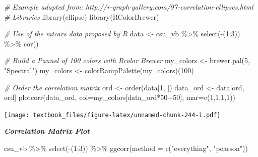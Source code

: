 \documentclass[
  11pt,
]{book}
\newenvironment{Shaded}{\begin{snugshade}}{\end{snugshade}}
\newcommand{\AttributeTok}[1]{\textcolor[rgb]{0.77,0.63,0.00}{#1}}
\newcommand{\CommentTok}[1]{\textcolor[rgb]{0.56,0.35,0.01}{\textit{#1}}}
\newcommand{\DecValTok}[1]{\textcolor[rgb]{0.00,0.00,0.81}{#1}}
\newcommand{\FunctionTok}[1]{\textcolor[rgb]{0.00,0.00,0.00}{#1}}
\newcommand{\NormalTok}[1]{#1}
\newcommand{\OtherTok}[1]{\textcolor[rgb]{0.56,0.35,0.01}{#1}}
\newcommand{\SpecialCharTok}[1]{\textcolor[rgb]{0.00,0.00,0.00}{#1}}
\newcommand{\StringTok}[1]{\textcolor[rgb]{0.31,0.60,0.02}{#1}}
\theoremstyle{definition}
\theoremstyle{definition}
\theoremstyle{definition}
\theoremstyle{definition}
\theoremstyle{remark}
\begin{document}
\begin{Shaded}
\begin{Highlighting}[]
\CommentTok{\# Example adapted from: http://r{-}graph{-}gallery.com/97{-}correlation{-}ellipses.html}
\CommentTok{\# Libraries}
\FunctionTok{library}\NormalTok{(ellipse)}
\FunctionTok{library}\NormalTok{(RColorBrewer)}

\CommentTok{\# Use of the mtcars data proposed by R}
\NormalTok{data }\OtherTok{\textless{}{-}}\NormalTok{ csu\_vb }\SpecialCharTok{\%\textgreater{}\%} \FunctionTok{select}\NormalTok{(}\SpecialCharTok{{-}}\NormalTok{(}\DecValTok{1}\SpecialCharTok{:}\DecValTok{3}\NormalTok{)) }\SpecialCharTok{\%\textgreater{}\%} \FunctionTok{cor}\NormalTok{()}

\CommentTok{\# Build a Pannel of 100 colors with Rcolor Brewer}
\NormalTok{my\_colors }\OtherTok{\textless{}{-}} \FunctionTok{brewer.pal}\NormalTok{(}\DecValTok{5}\NormalTok{, }\StringTok{"Spectral"}\NormalTok{)}
\NormalTok{my\_colors }\OtherTok{\textless{}{-}} \FunctionTok{colorRampPalette}\NormalTok{(my\_colors)(}\DecValTok{100}\NormalTok{)}

\CommentTok{\# Order the correlation matrix}
\NormalTok{ord }\OtherTok{\textless{}{-}} \FunctionTok{order}\NormalTok{(data[}\DecValTok{1}\NormalTok{, ])}
\NormalTok{data\_ord }\OtherTok{\textless{}{-}}\NormalTok{ data[ord, ord]}
\FunctionTok{plotcorr}\NormalTok{(data\_ord, }\AttributeTok{col=}\NormalTok{my\_colors[data\_ord}\SpecialCharTok{*}\DecValTok{50}\SpecialCharTok{+}\DecValTok{50}\NormalTok{], }\AttributeTok{mar=}\FunctionTok{c}\NormalTok{(}\DecValTok{1}\NormalTok{,}\DecValTok{1}\NormalTok{,}\DecValTok{1}\NormalTok{,}\DecValTok{1}\NormalTok{))}
\end{Highlighting}
\end{Shaded}

\texttt{[image: textbook\_files/figure-latex/unnamed-chunk-244-1.pdf]}

\newpage

\textbf{\emph{Correlation Matrix Plot}}

\begin{Shaded}
\begin{Highlighting}[]
\NormalTok{csu\_vb }\SpecialCharTok{\%\textgreater{}\%} \FunctionTok{select}\NormalTok{(}\SpecialCharTok{{-}}\NormalTok{(}\DecValTok{1}\SpecialCharTok{:}\DecValTok{3}\NormalTok{)) }\SpecialCharTok{\%\textgreater{}\%} 
  \FunctionTok{ggcorr}\NormalTok{(}\AttributeTok{method =} \FunctionTok{c}\NormalTok{(}\StringTok{"everything"}\NormalTok{, }\StringTok{"pearson"}\NormalTok{))}
\end{Highlighting}
\end{Shaded}
\end{document}
